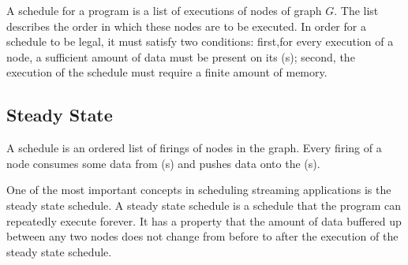 \begin{comment}
Each {\joiner} node $n_j$ is associated with a tuple $(w_j, u_j)$.
The first value is a vector of integers, each representing the
amount of data that will be consumed by $n_j$ from its
corresponding {\Input} {\Channels}.  In order to execute $n_j$,
each of its {\Input} {\Channels} must have at least as much data
in it as the corresponding value in $w_j$ indicates.  $u_j$
represents the amount of data that will be pushed by $n_j$ onto
its {\Output} {\Channel}. The amount of data present in the $i$th
{\Input} {{\Channel}} of a {\joiner} node $n_j$ is denoted
$in_{j,i}$, while data present in the {\Output} {{\Channel}} is
denoted $in_s$.
\end{comment}

A schedule for a {\StreamIt} program is a list of executions of
nodes of graph $G$.  The list describes the order in which these
nodes are to be executed.  In order for a schedule to be legal, it
must satisfy two conditions: first,for every execution of a node,
a sufficient amount of data must be present on its {\Input}
{\Channel}(s); second, the execution of the schedule must require
a finite amount of memory.

\subsection{Steady State}
\label{sec:steady-state}

A {\StreamIt} schedule is an ordered list of firings of nodes in the
{\StreamIt} graph.  Every firing of a node consumes some data from
{\Input} {{\Channel}}(s) and pushes data onto the {\Output} {{\Channel}}(s).

One of the most important concepts in scheduling streaming
applications is the steady state schedule.  A steady state
schedule is a schedule that the program can repeatedly execute
forever.  It has a property that the amount of data buffered up
between any two nodes does not change from before to after the
execution of the steady state schedule.

\begin{comment}
This property is important, because it allows the compiler to
statically schedule the program at compile time, and simply repeat
the schedule forever at runtime.  A schedule without this property
cannot be repeated continuously.  This is because the delta in
amount of data buffered up on between nodes will continue
accumulating, requiring an infinite amount of buffering space.
\end{comment}

